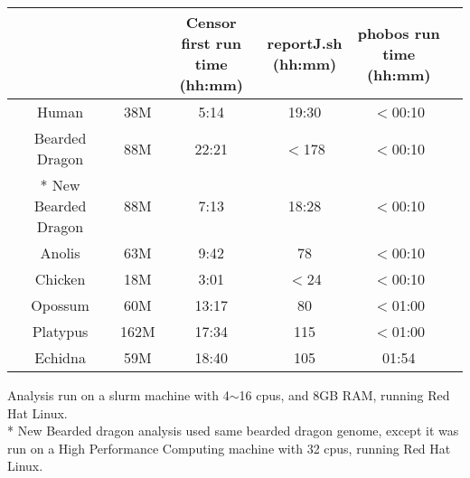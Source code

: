 \documentclass[a4paper,12pt]{article}
\begin{document}
	\footnotesize  %
	\setlength\tabcolsep{1.5pt}
	\begin{center}
		\begin{tabular}{ | c | c | c | c| c |c|}
			\hline
			\thead{Genome}	& 	\thead{Consensus sequences size}	&	\thead{Censor first run \\ time (hh:mm)}	&	\thead{reportJ.sh \\ (hh:mm)}	&	\thead{phobos run time \\ (hh:mm)} \\
			\hline
			Human	&	38M	&	5:14	&	19:30	&	$<$00:10 \\
			\hline 
			Bearded Dragon	&	88M	&	22:21	&	$<$178	&	$<$00:10 \\
			\hline
			* New Bearded Dragon	&	88M	&	7:13	&	18:28	&	$<$00:10 \\
			\hline
			Anolis	&	63M	&	9:42	&	78	&	$<$00:10 \\
			\hline
			Chicken	&	18M	&	3:01	&	$<$24	&	$<$00:10 \\
			\hline
			Opossum	&	60M	&	13:17	&	80	&	$<$01:00 \\
			\hline
			Platypus	&	162M	&	17:34	&	115	&	$<$01:00 \\
			\hline
			Echidna	&	59M	&	18:40	&	105	&	01:54 \\
			\hline
		\end{tabular}
	\end{center}
	
	\noindent Analysis run on a slurm machine with 4$\sim$16 cpus, and 8GB RAM, running Red Hat Linux.\\
	{*} New Bearded dragon analysis used same bearded dragon genome, except it was run on a High Performance Computing machine with 32 cpus, running Red Hat Linux. \\
\end{document}
